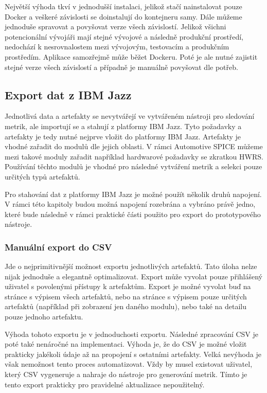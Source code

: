 \documentclass[czech,master,public,dept460,male,cpdeclaration,oneside]{diploma}
\begin{document}
Největší výhoda tkví v jednodušší instalaci, jelikož stačí nainstalovat pouze Docker a veškeré závislosti se doinstalují do kontejneru samy. Dále můžeme jednoduše spravovat a povyšovat verze všech závislostí. Jelikož všichni potencionální vývojáři mají stejné vývojové a následně produkční prostředí, nedochází k nesrovnalostem mezi vývojovým, testovacím a produkčním prostředím. Aplikace samozřejmě může běžet Dockeru. Poté je ale nutné zajistit stejné verze všech závislostí a případně je manuálně povyšovat dle potřeb.



\subsection{Export dat z IBM Jazz}
\label{sec:ibm_export}
Jednotlivá data a artefakty se nevytvářejí ve vytvářeném nástroji pro sledování metrik, ale importují se a stahují z platformy IBM Jazz. Tyto požadavky a artefakty je tedy nutné nejprve vložit do platformy IBM Jazz. Artefakty je vhodné zařadit do modulů dle jejich oblasti. V rámci Automotive SPICE můžeme mezi takové moduly zařadit například hardwarové požadavky se zkratkou HWRS. Používání těchto modulů je vhodné pro následné vytváření metrik a selekci pouze určitých typů artefaktů.

Pro stahování dat z platformy IBM Jazz je možné použít několik druhů napojení. V rámci této kapitoly budou možná napojení rozebrána a vybráno právě jedno, které bude následně v rámci praktické části použito pro export do prototypového nástroje.

\subsubsection{Manuální export do CSV}
Jde o nejprimitivnější možnost exportu jednotlivých artefaktů. Tato úloha nelze nijak jednoduše a elegantně optimalizovat. Export může vyvolat pouze přihlášený uživatel s povolenými přístupy k artefaktům. Export je možné vyvolat buď na stránce s výpisem všech artefaktů, nebo na stránce s výpisem pouze určitých artefaktů (například při zobrazení jen daného modulu), nebo také na detailu pouze jednoho artefaktu.

Výhoda tohoto exportu je v jednoduchosti exportu. Následné zpracování CSV je poté také nenáročné na implementaci. Výhoda je, že do CSV je možné vložit prakticky jakékoli údaje až na propojení s ostatními artefakty. Velká nevýhoda je však nemožnost tento proces automatizovat. Vždy by musel existovat uživatel, který CSV vygeneruje a nahraje do nástroje pro generování metrik. Tímto je tento export prakticky pro pravidelné aktualizace nepoužitelný.
\end{document}
